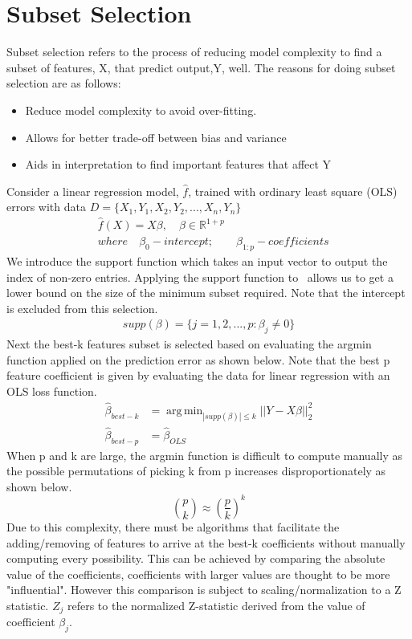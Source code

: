 \documentclass[a4paper]{article}
\DeclareMathOperator*{\argmin}{arg\,min}
\begin{document}
\section{Subset Selection}
Subset selection refers to the process of reducing model complexity to find a subset of features, X, that predict output,Y, well. The reasons for doing subset selection are as follows:
\begin{itemize}
  \item Reduce model complexity to avoid over-fitting.
  \item Allows for better trade-off between bias and variance
  \item Aids in interpretation to find important features that affect Y
\end{itemize}
Consider a linear regression model, $\hat{f}$, trained with ordinary least square (OLS) errors with data $D = \{X_1,Y_1,X_2,Y_2,...,X_n,Y_n\}$
\begin{align*}
	&\hat{f}(X)=X\beta, \quad \beta \in \mathds{R}^{1+p}\\
    &where\quad\beta_0 - intercept;\qquad \beta_{1:p} - coefficients 
\end{align*}
We introduce the support function which takes an input vector to output the index of non-zero entries. Applying the support function to \textbeta\ allows us to get a lower bound on the size of the minimum subset required. Note that the intercept is excluded from this selection.
\begin{align*}
	supp(\beta) = \{j = 1,2,...,p:\beta_j\neq 0\}
\end{align*}
Next the best-k features subset is selected based on evaluating the argmin function applied on the prediction error as shown below. Note that the best p feature coefficient is given by evaluating the data for linear regression with an OLS loss function.
\begin{align*}
	\hat{\beta}_{best-k} &= \argmin_{|supp(\beta)|\leq k}||Y-X\beta ||^2_2\\
    \hat{\beta}_{best-p} &= \hat{\beta}_{OLS}
\end{align*}
When p and k are large, the argmin function is difficult to compute manually as the possible permutations of picking k from p increases disproportionately as shown below.
$${p\choose k}\approx (\frac{p}{k})^k$$
Due to this complexity, there must be algorithms that facilitate the adding/removing of features to arrive at the best-k coefficients without manually computing every possibility. This can be achieved by comparing the absolute value of the coefficients, coefficients with larger values are thought to be more "influential". However this comparison is subject to scaling/normalization to a Z statistic. $Z_j$ refers to the normalized Z-statistic derived from the value of coefficient $\beta_j$.
\end{document}
